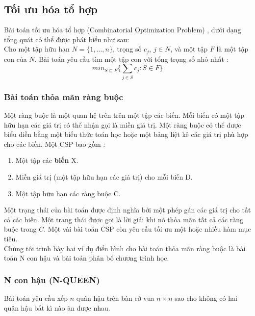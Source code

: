 \documentclass[a4paper,12pt]{report}
\begin{document}
\subsection{Tối ưu hóa tổ hợp}
Bài toán tối ưu hóa tổ hợp (Combinatorial Optimization Problem) \cite{IP}, \cite{TRR} dưới dạng tổng quát có thể được phát biểu như sau: \\

Cho một  tập hữu hạn $N=\{1,\dots,n\}$, trọng số $c_j, \ j \in N$, và một tập $F$ là một tập con của $N$. Bài toán yêu cầu tìm một tập con với tổng trọng số nhỏ nhất : 
$$min_{S \subseteq F}\{\sum_{j \in S}c_j:S \in F\}$$
\subsubsection{Bài toán thỏa mãn ràng buộc}
Một ràng buộc \cite{AIAMAB} là một quan hệ trên trên một tập các biến. Mỗi biến có một tập hữu hạn các giá trị có thể nhận gọi là miền giá trị. Một ràng buộc có thể được biểu diễn bằng một biểu thức toán học hoặc một bảng liệt kê các giá trị phù hợp cho các biến. 
Một \ac{CSP} bao gồm : \begin{enumerate}
\item Một tập các \textbf{biến} X.
\item Miền giá trị (một tập hữu hạn các giá trị) cho mỗi biến D.
\item Một tập hữu hạn các ràng buộc C.
\end{enumerate}  
Một trạng thái của bài toán được định nghĩa bởi một phép gán các giá trị cho tất cả các biến. Một trạng thái được gọi là lời giải khi nó thỏa mãn tất cả các ràng buộc trong $C$. Một vài bài toán \ac{CSP} còn yêu cầu tối ưu một hoặc nhiều hàm mục tiêu.  \\

Chúng tôi trình bày hai ví dụ điển hình cho bài toán thỏa mãn ràng buộc là bài toán N con hậu và bài toán phân bổ chương trình học.
\subsubsection{N con hậu (N-QUEEN)}
Bài toán yêu cầu xếp $n$ quân hậu trên bàn cờ vua $n\times n$ sao cho không có hai quân hậu bất kì nào ăn được nhau.
\end{document}
